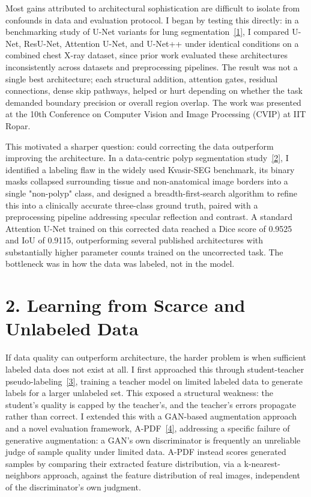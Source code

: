 \documentclass[11pt]{article}
\begin{document}
Most gains attributed to architectural sophistication are difficult to isolate from confounds in data and evaluation protocol. I began by testing this directly: in a benchmarking study of U-Net variants for lung segmentation~\hyperref[ref1]{[1]}, I compared U-Net, ResU-Net, Attention U-Net, and U-Net++ under identical conditions on a combined chest X-ray dataset, since prior work evaluated these architectures inconsistently across datasets and preprocessing pipelines. The result was not a single best architecture; each structural addition, attention gates, residual connections, dense skip pathways, helped or hurt depending on whether the task demanded boundary precision or overall region overlap. The work was presented at the 10th Conference on Computer Vision and Image Processing (CVIP) at IIT Ropar.

This motivated a sharper question: could correcting the data outperform improving the architecture. In a data-centric polyp segmentation study~\hyperref[ref2]{[2]}, I identified a labeling flaw in the widely used Kvasir-SEG benchmark, its binary masks collapsed surrounding tissue and non-anatomical image borders into a single "non-polyp" class, and designed a breadth-first-search algorithm to refine this into a clinically accurate three-class ground truth, paired with a preprocessing pipeline addressing specular reflection and contrast. A standard Attention U-Net trained on this corrected data reached a Dice score of 0.9525 and IoU of 0.9115, outperforming several published architectures with substantially higher parameter counts trained on the uncorrected task. The bottleneck was in how the data was labeled, not in the model.

\section*{2. Learning from Scarce and Unlabeled Data}

If data quality can outperform architecture, the harder problem is when sufficient labeled data does not exist at all. I first approached this through student-teacher pseudo-labeling~\hyperref[ref3]{[3]}, training a teacher model on limited labeled data to generate labels for a larger unlabeled set. This exposed a structural weakness: the student's quality is capped by the teacher's, and the teacher's errors propagate rather than correct. I extended this with a GAN-based augmentation approach and a novel evaluation framework, A-PDF~\hyperref[ref4]{[4]}, addressing a specific failure of generative augmentation: a GAN's own discriminator is frequently an unreliable judge of sample quality under limited data. A-PDF instead scores generated samples by comparing their extracted feature distribution, via a k-nearest-neighbors approach, against the feature distribution of real images, independent of the discriminator's own judgment.
\end{document}
